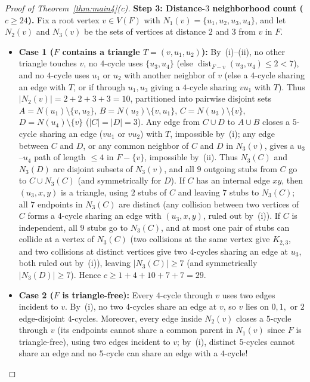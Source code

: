 \documentclass[11pt,reqno]{amsart}
\theoremstyle{plain}
\theoremstyle{definition}
\theoremstyle{remark}
\DeclareRobustCommand{\_}{\ifmmode\text{\textunderscore}\else\textunderscore\allowbreak\fi}
\begin{document}
\begin{proof}[Proof of Theorem~\ref{thm:main4}(c)]
\medskip
\noindent\textbf{Step 3: Distance-$3$ neighborhood count ($c \ge 24$).}
Fix a root vertex $v \in V(F)$ with $N_1(v) = \{u_1, u_2, u_3, u_4\}$, and let $N_2(v)$ and $N_3(v)$ be the sets of vertices at distance $2$ and $3$ from $v$ in $F$.
\begin{itemize}[leftmargin=1.6em]
  \item \textbf{Case 1 ($F$ contains a triangle $T = (v, u_1, u_2)$):} By~(i)--(ii), no other triangle touches $v$, no $4$-cycle uses $\{u_3, u_4\}$ (else $\operatorname{dist}_{F-v}(u_3, u_4) \le 2 < 7$), and no $4$-cycle uses $u_1$ or $u_2$ with another neighbor of $v$ (else a $4$-cycle sharing an edge with $T$, or if through $u_1, u_3$ giving a $4$-cycle sharing $v u_1$ with $T$). Thus $|N_2(v)| = 2 + 2 + 3 + 3 = 10$, partitioned into pairwise disjoint sets $A = N(u_1) \setminus \{v, u_2\}$, $B = N(u_2) \setminus \{v, u_1\}$, $C = N(u_3) \setminus \{v\}$, $D = N(u_4) \setminus \{v\}$ ($|C| = |D| = 3$). Any edge from $C \cup D$ to $A \cup B$ closes a $5$-cycle sharing an edge ($v u_1$ or $v u_2$) with $T$, impossible by~(i); any edge between $C$ and $D$, or any common neighbor of $C$ and $D$ in $N_3(v)$, gives a $u_3$--$u_4$ path of length $\le 4$ in $F - \{v\}$, impossible by~(ii). Thus $N_3(C)$ and $N_3(D)$ are disjoint subsets of $N_3(v)$, and all $9$ outgoing stubs from $C$ go to $C \cup N_3(C)$ (and symmetrically for $D$). If $C$ has an internal edge $xy$, then $(u_3, x, y)$ is a triangle, using $2$ stubs of $C$ and leaving $7$ stubs to $N_3(C)$; all $7$ endpoints in $N_3(C)$ are distinct (any collision between two vertices of $C$ forms a $4$-cycle sharing an edge with $(u_3, x, y)$, ruled out by~(i)). If $C$ is independent, all $9$ stubs go to $N_3(C)$, and at most one pair of stubs can collide at a vertex of $N_3(C)$ (two collisions at the same vertex give $K_{2,3}$, and two collisions at distinct vertices give two $4$-cycles sharing an edge at $u_3$, both ruled out by~(i)), leaving $|N_3(C)| \ge 7$ (and symmetrically $|N_3(D)| \ge 7$). Hence $c \ge 1 + 4 + 10 + 7 + 7 = 29$.
  \item \textbf{Case 2 ($F$ is triangle-free):} Every $4$-cycle through $v$ uses two edges incident to $v$. By~(i), no two $4$-cycles share an edge at $v$, so $v$ lies on $0, 1,$ or $2$ edge-disjoint $4$-cycles. Moreover, every edge inside $N_2(v)$ closes a $5$-cycle through $v$ (its endpoints cannot share a common parent in $N_1(v)$ since $F$ is triangle-free), using two edges incident to $v$; by~(i), distinct $5$-cycles cannot share an edge and no $5$-cycle can share an edge with a $4$-cycle!

\end{itemize}
\end{proof}
\end{document}
